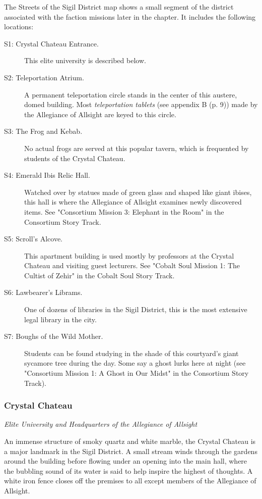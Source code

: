 \documentclass[letterpaper, 11pt, bg=full, twocolumn]{dndbook}
\begin{document}
The Streets of the Sigil District map shows a small segment of the district associated with the faction missions later in the chapter. It includes the following locations:

\begin{description}
\item[S1: Crystal Chateau Entrance.] This elite university is described below.
\item[S2: Teleportation Atrium.] A permanent teleportation circle stands in the center of this austere, domed building. Most \textit{teleportation tablets} (see appendix B (p. 9)) made by the Allegiance of Allsight are keyed to this circle.
\item[S3: The Frog and Kebab.] No actual frogs are served at this popular tavern, which is frequented by students of the Crystal Chateau.
\item[S4: Emerald Ibis Relic Hall.] Watched over by statues made of green glass and shaped like giant ibises, this hall is where the Allegiance of Allsight examines newly discovered items. See "Consortium Mission 3: Elephant in the Room" in the Consortium Story Track.
\item[S5: Scroll's Alcove.] This apartment building is used mostly by professors at the Crystal Chateau and visiting guest lecturers. See "Cobalt Soul Mission 1: The Cultist of Zehir" in the Cobalt Soul Story Track.
\item[S6: Lawbearer's Librams.] One of dozens of libraries in the Sigil District, this is the most extensive legal library in the city.
\item[S7: Boughs of the Wild Mother.] Students can be found studying in the shade of this courtyard's giant sycamore tree during the day. Some say a ghost lurks here at night (see "Consortium Mission 1: A Ghost in Our Midst" in the Consortium Story Track).
\end{description}



\subsubsection{Crystal Chateau}

\textit{Elite University and Headquarters of the Allegiance of Allsight}

An immense structure of smoky quartz and white marble, the Crystal Chateau is a major landmark in the Sigil District. A small stream winds through the gardens around the building before flowing under an opening into the main hall, where the bubbling sound of its water is said to help inspire the highest of thoughts. A white iron fence closes off the premises to all except members of the Allegiance of Allsight.
\end{document}
